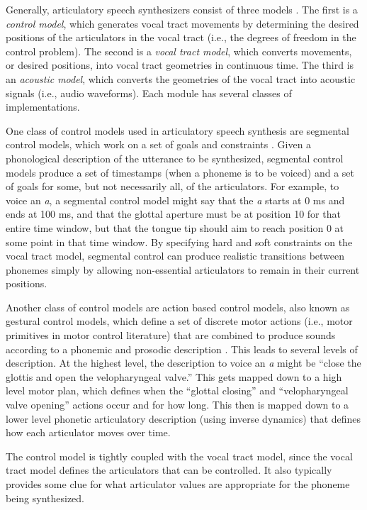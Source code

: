 \documentclass{article}
\begin{document}
Generally, articulatory speech synthesizers
consist of three models
\citep{kroger2009}.
The first is a \textit{control model},
which generates vocal tract movements
by determining the desired positions
of the articulators in the vocal tract
(i.e., the degrees of freedom in the control problem).
The second is a \textit{vocal tract model},
which converts movements, or desired positions,
into vocal tract geometries in continuous time.
The third is an \textit{acoustic model},
which converts the geometries of the vocal tract
into acoustic signals (i.e., audio waveforms).
Each module has several classes of implementations.

One class of control models used in
articulatory speech synthesis
are segmental control models,
which work on a set of goals and constraints
\citep{kroger1992}.
Given a phonological description
of the utterance to be synthesized,
segmental control models
produce a set of timestamps
(when a phoneme is to be voiced)
and a set of goals for some,
but not necessarily all,
of the articulators.
For example, to voice an \textit{a},
a segmental control model might say
that the \textit{a} starts at 0 ms
and ends at 100 ms,
and that the glottal aperture
must be at position 10
for that entire time window,
but that the tongue tip
should aim to reach position 0
at some point in that time window.
By specifying hard and soft constraints
on the vocal tract model,
segmental control can produce
realistic transitions between
phonemes simply by allowing
non-essential articulators to
remain in their current positions.

Another class of control models are
action based control models,
also known as gestural control models,
which define a set of discrete motor actions
(i.e., motor primitives in motor control literature)
that are combined to produce sounds according
to a phonemic and prosodic description
\citep{birkholz2006}.
This leads to several levels of description.
At the highest level,
the description to voice an \textit{a}
might be
``close the glottis
and open the velopharyngeal valve.''
This gets mapped down to a
high level motor plan,
which defines when the ``glottal closing''
and ``velopharyngeal valve opening''
actions occur and for how long.
This then is mapped down
to a lower level phonetic articulatory description
(using inverse dynamics)
that defines how each articulator
moves over time.

The control model is tightly coupled
with the vocal tract model,
since the vocal tract model defines
the articulators that can be controlled.
It also typically provides some clue
for what articulator values
are appropriate for the
phoneme being synthesized.
\end{document}
